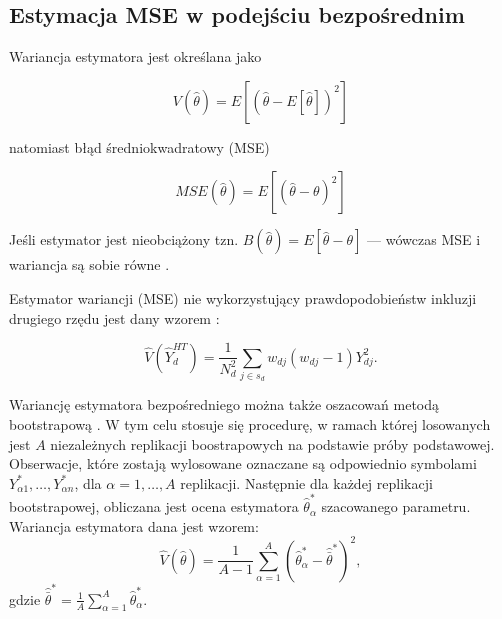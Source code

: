\subsection{Estymacja MSE w podejściu bezpośrednim}

Wariancja estymatora jest określana jako

\begin{equation}
V(\hat{\theta})=E[(\hat{\theta}-E[\hat{\theta}])^2]
\end{equation}

natomiast błąd średniokwadratowy (MSE)

\begin{equation}
MSE(\hat{\theta})=E[(\hat{\theta}-\theta)^2]
\end{equation}

Jeśli estymator jest nieobciążony tzn. $B(\hat{\theta})=E[\hat{\theta}-\theta]$ --- wówczas MSE i wariancja są sobie równe \citep{rao2015}. 

Estymator wariancji (MSE) nie wykorzystujący prawdopodobieństw inkluzji drugiego rzędu jest dany wzorem \citep{molina-marhuenda2015}:

\begin{equation}
\hat{V}\left(\hat{Y}^{HT}_d\right)=\frac{1}{N_d^2}\sum\limits_{j \in s_d}{w_{dj}(w_{dj}-1)Y^2_{dj}}.
\end{equation}

Wariancję estymatora bezpośredniego można także oszacowań metodą bootstrapową \citep{wolter2007}. W tym celu stosuje się procedurę, w ramach której losowanych jest $A$ niezależnych replikacji boostrapowych na podstawie próby podstawowej. Obserwacje, które zostają wylosowane oznaczane są odpowiednio symbolami $Y^*_{\alpha 1},\ldots, Y^*_{\alpha n}$, dla $\alpha=1,\ldots,A$ replikacji. Następnie dla każdej replikacji bootstrapowej, obliczana jest ocena estymatora $\hat{\theta}^{*}_\alpha$ szacowanego parametru. Wariancja estymatora dana jest wzorem:
\begin{equation}
\hat{V}(\hat{\theta})=\frac{1}{A-1}\sum\limits_{\alpha=1}^{A}{(\hat{\theta}^{*}_{\alpha}-\hat{\bar{\theta}}^*)^2},
\end{equation}
gdzie $\hat{\bar{\theta}}^*=\frac{1}{A}\sum\limits_{\alpha=1}^{A}{\hat{\theta}^{*}_{\alpha}}$.


